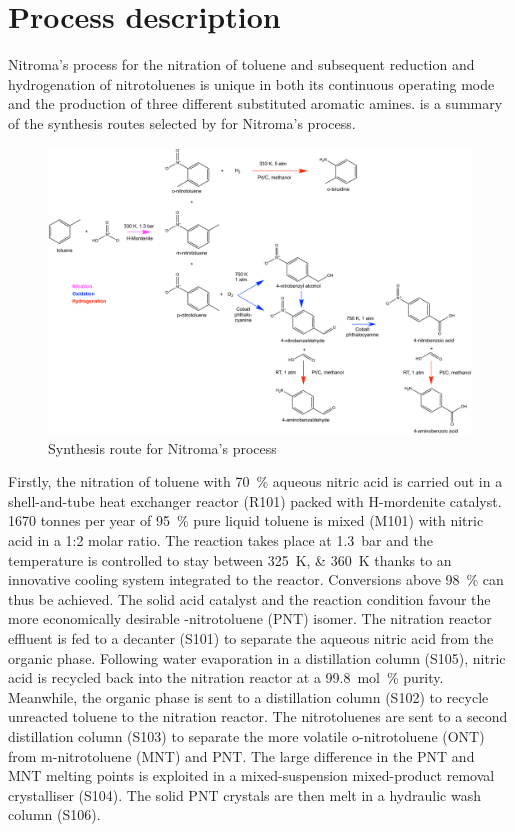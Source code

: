 \section{Process description}

Nitroma's process for the nitration of toluene and subsequent reduction and hydrogenation of nitrotoluenes is unique in both its continuous operating mode and the production of three different substituted aromatic amines.   is a summary of the synthesis routes selected by for Nitroma's process.
\begin{figure}[H]
    \centering
    \includegraphics[width=0.8\linewidth]{chapters/2-reaction/figures/routes-chosen.pdf}
    \caption{Synthesis route for Nitroma's process}
    \label{fig:routes-SI}
\end{figure}

Firstly, the nitration of toluene with \SI{70}{\percent} aqueous nitric acid is carried out in a shell-and-tube heat exchanger reactor (R101) packed with H-mordenite catalyst. 1670 tonnes per year of \SI{95}{\percent} pure liquid toluene is mixed (M101) with nitric acid in a 1:2 molar ratio. The reaction takes place at \SI{1.3}{\bar} and the temperature is controlled to stay between \SIlist{325;360}{\K} thanks to an innovative cooling system integrated to the reactor. Conversions above \SI{98}{\percent} can thus be achieved. The solid acid catalyst and the reaction condition favour the more economically desirable \para-nitrotoluene (PNT) isomer. The nitration reactor effluent is fed to a decanter (S101) to separate the aqueous nitric acid from the organic phase. Following water evaporation in a distillation column (S105), nitric acid is recycled back into the nitration reactor at a \SI{99.8}{\mol\percent} purity.  Meanwhile, the organic phase is sent to a distillation column (S102) to recycle unreacted toluene to the nitration reactor. The nitrotoluenes are sent to a second distillation column (S103) to separate the more volatile o-nitrotoluene (ONT) from m-nitrotoluene (MNT) and PNT. The large difference in the PNT and MNT melting points is exploited in a mixed-suspension mixed-product removal crystalliser (S104). The solid PNT crystals are then melt in a hydraulic wash column (S106).

